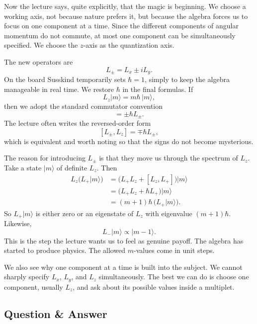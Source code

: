 Now the lecture says, quite explicitly, that the magic is beginning. We choose a working axis, not because nature prefers it, but because the algebra forces us to focus on one component at a time. Since the different components of angular momentum do not commute, at most one component can be simultaneously specified. We choose the \(z\)-axis as the quantization axis.

The new operators are
\begin{equation}
L_\pm=L_x\pm iL_y.
\end{equation}
On the board Susskind temporarily sets \(\hbar=1\), simply to keep the algebra manageable in real time. We restore \(\hbar\) in the final formulas. If
\begin{equation}
L_z\lvert m\rangle=m\hbar\,\lvert m\rangle,
\end{equation}
then we adopt the standard commutator convention
\begin{equation}
[L_z,L_\pm]=\pm \hbar L_\pm.
\end{equation}
The lecture often writes the reversed-order form
\[
[L_\pm,L_z]=\mp \hbar L_\pm,
\]
which is equivalent and worth noting so that the signs do not become mysterious.

The reason for introducing \(L_\pm\) is that they move us through the spectrum of \(L_z\). Take a state \(\lvert m\rangle\) of definite \(L_z\). Then
\begin{align}
L_z\bigl(L_+\lvert m\rangle\bigr)
&=\bigl(L_+L_z+[L_z,L_+]\bigr)\lvert m\rangle \\
&=\bigl(L_+L_z+\hbar L_+\bigr)\lvert m\rangle \\
&=(m+1)\hbar\,\bigl(L_+\lvert m\rangle\bigr).
\end{align}
So \(L_+\lvert m\rangle\) is either zero or an eigenstate of \(L_z\) with eigenvalue \((m+1)\hbar\). Likewise,
\begin{equation}
L_-\lvert m\rangle\propto \lvert m-1\rangle.
\end{equation}
This is the step the lecture wants us to feel as genuine payoff. The algebra has started to produce physics. The allowed \(m\)-values come in unit steps.

We also see why one component at a time is built into the subject. We cannot sharply specify \(L_x\), \(L_y\), and \(L_z\) simultaneously. The best we can do is choose one component, usually \(L_z\), and ask about its possible values inside a multiplet.

\subsection{Question \& Answer}

